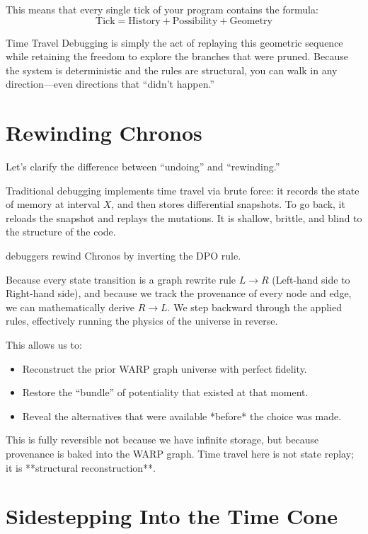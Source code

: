 This means that every single tick of your program contains the formula:
$$ \text{Tick} = \text{History} + \text{Possibility} + \text{Geometry} $$

Time Travel Debugging is simply the act of replaying this geometric sequence while retaining the freedom to explore the branches that were pruned. Because the system is deterministic and the rules are structural, you can walk in any direction—even directions that ``didn't happen.''

\section{Rewinding Chronos}

Let's clarify the difference between ``undoing'' and ``rewinding.''

Traditional debugging implements time travel via brute force: it records the state of memory at interval $X$, and then stores differential snapshots. To go back, it reloads the snapshot and replays the mutations. It is shallow, brittle, and blind to the structure of the code.

\COMPUTER{} debuggers rewind Chronos by inverting the DPO rule.

Because every state transition is a graph rewrite rule $L \to R$ (Left-hand side to Right-hand side), and because we track the provenance of every node and edge, we can mathematically derive $R \to L$. We step backward through the applied rules, effectively running the physics of the universe in reverse.

This allows us to:
\begin{itemize}
    \item Reconstruct the prior WARP graph universe with perfect fidelity.
    \item Restore the ``bundle'' of potentiality that existed at that moment.
    \item Reveal the alternatives that were available *before* the choice was made.
\end{itemize}

This is fully reversible not because we have infinite storage, but because provenance is baked into the WARP graph. Time travel here is not state replay; it is **structural reconstruction**.

\section{Sidestepping Into the Time Cone}

